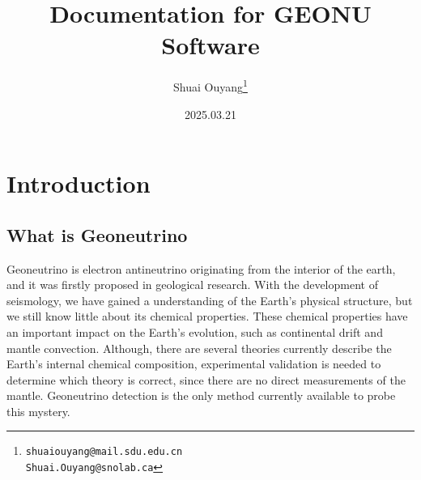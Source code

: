 
\usepackage{multirow}  %
\usepackage{booktabs}  %

\title{\textbf{Documentation for GEONU Software}}
\author{Shuai Ouyang\thanks{\parbox[t]{4.5cm}{%
			\texttt{shuaiouyang@mail.sdu.edu.cn} \\ 
			\texttt{Shuai.Ouyang@snolab.ca}}}}
\date{2025.03.21}


	\maketitle							%
	\thispagestyle{empty}				%
	\frontmatter						%
	\cleardoublepage				 	%
	\tableofcontents				  	%
	\mainmatter							%
	\chapter{Introduction}
		\section{What is Geoneutrino}
			Geoneutrino is electron antineutrino originating from the interior of the earth, and it was firstly proposed in geological research. With the development of seismology, we have gained a understanding of the Earth's physical structure, but we still know little about its chemical properties. These chemical properties have an important impact on the Earth's evolution, such as continental drift and mantle convection. Although, there are several theories currently describe the Earth's internal chemical composition, experimental validation is needed to determine which theory is correct, since there are no direct measurements of the mantle. Geoneutrino detection is the only method currently available to probe this mystery.\par
			
